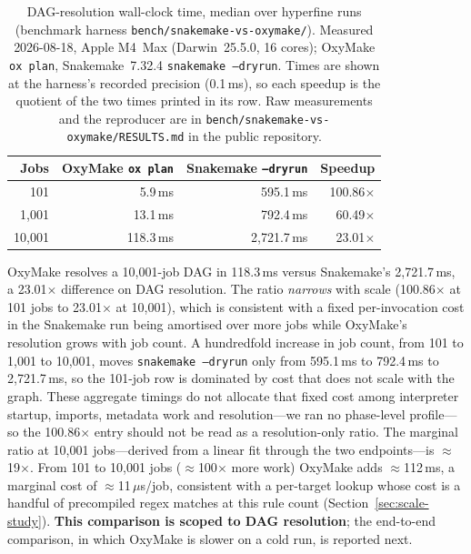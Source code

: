 \documentclass[12pt,a4paper]{article}
\newcommand{\code}[1]{{\texttt{\small\color{inlinecode}#1}}}
\begin{document}
\begin{table}[htbp]
\centering\small
\begin{tabular}{@{}rrrr@{}}
\toprule
\textbf{Jobs} & \textbf{OxyMake \code{ox plan}} & \textbf{Snakemake \code{--dryrun}} & \textbf{Speedup} \\
\midrule
101      &    5.9\,ms  &    595.1\,ms  & 100.86$\times$ \\
1{,}001  &   13.1\,ms  &    792.4\,ms  & 60.49$\times$ \\
10{,}001 &  118.3\,ms  & 2{,}721.7\,ms  & 23.01$\times$ \\
\bottomrule
\end{tabular}
\caption{DAG-resolution wall-clock time, median over hyperfine runs
  (benchmark harness \code{bench/snakemake-vs-oxymake/}). Measured 2026-08-18,
  Apple M4~Max (Darwin~25.5.0, 16 cores); OxyMake \code{ox plan},
  Snakemake~7.32.4 \code{snakemake --dryrun}. Times are shown at the
  harness's recorded precision (0.1\,ms), so each speedup is the
  quotient of the two times printed in its row. Raw
  measurements and the reproducer are in
  \code{bench/snakemake-vs-oxymake/RESULTS.md} in the public repository.}
\label{tab:dag-resolution}
\end{table}

\noindent OxyMake resolves a 10{,}001-job DAG in 118.3\,ms versus
Snakemake's 2{,}721.7\,ms, a 23.01$\times$ difference on DAG resolution. The ratio
\emph{narrows} with scale (100.86$\times$ at 101 jobs to 23.01$\times$ at 10{,}001),
which is consistent with a fixed per-invocation cost in the Snakemake
run being amortised over more jobs while OxyMake's resolution grows
with job count. A hundredfold increase in job count, from 101 to
1{,}001 to 10{,}001, moves \code{snakemake --dryrun} only from 595.1\,ms
to 792.4\,ms to 2{,}721.7\,ms, so the 101-job row is dominated by cost that
does not scale with the graph. These aggregate timings do not allocate
that fixed cost among interpreter startup, imports, metadata work and
resolution---we ran no phase-level profile---so the
100.86$\times$ entry should not be read as a resolution-only ratio. The
marginal ratio at 10{,}001 jobs---derived from a linear fit through the
two endpoints---is $\approx$19$\times$. From 101 to 10{,}001 jobs ($\approx$100$\times$
more work) OxyMake adds $\approx$112\,ms, a marginal cost of $\approx$11\,$\mu$s/job,
consistent with a per-target lookup whose cost is a handful of precompiled
regex matches at this rule count (Section~\ref{sec:scale-study}).
\textbf{This comparison is scoped to DAG resolution}; the end-to-end
comparison, in which OxyMake is slower on a cold run, is reported next.
\end{document}
